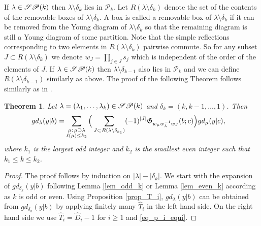 \documentclass[a4paper]{amsart}
\newtheorem{thm}{Theorem}[section]
\theoremstyle{remark}
\numberwithin{equation}{section}
\begin{document}
 If $\lambda\in \mathscr{SP}(k)$ then  $\lambda\setminus \delta_k$ lies in $\mathscr{P}_k$.
Let $R(\lambda\setminus\delta_k)$ denote the set of the contents of the removable boxes of $\lambda\setminus \delta_k$. A box is called a removable box of $\lambda\setminus \delta_k$ if it can be removed from the Young diagram of $\lambda\setminus \delta_k$ so that the remaining diagram is still a Young diagram of some partition. Note that the simple reflections corresponding  to two elements in $R(\lambda\setminus\delta_k)$ pairwise commute.
So for any subset $J\subset R(\lambda\setminus\delta_k)$ we denote $w_J=\prod_{j\in J}s_j$ which is independent of the order of the elements of $J$. %
If $\lambda\in \mathscr{SP}(k)$ then $\lambda\setminus \delta_{k-1}$ also lies in $\mathscr{P}_k$ and we can define $R(\lambda\setminus\delta_{k-1})$ similarly as above. The proof of the following Theorem follows similarly as in \cite[Theorem 4.10]{BIIY}.

% 

\begin{thm}\label{thm:gp expansion}
Let $\lambda=(\lambda_1,\dots,\lambda_k)\in \mathscr{SP}(k)$ and $\delta_k=(k,k-1,\dots,1)$.  Then
 \begin{align*}
gd_\lambda(y| b)&=\sum_{\substack{\mu:\,\mu\supset \lambda\\ \ell(\mu)\leq k_2}}\Big(\sum_{J\subset R(\lambda\setminus \delta_{k_1})}
(-1)^{|J|} \mathfrak{G}_{w_{\mu}w_\lambda^{-1}w_J}(b;c)\Big)
 gd_{\mu}(y| c),
 \end{align*}
 where $k_1$ is the largest odd integer and $k_2$ is the smallest even integer such that $k_1\leq k\le k_2$.
\end{thm}

\begin{proof}
    The proof follows by induction on $|\lambda|-|\delta_k|$. We start with the expansion of $gd_{\delta_k}(y| b)$ following Lemma \ref{lem_odd_k} or Lemma \ref{lem_even_k} according as $k$ is odd or even. Using Proposition \ref{prop_T_i}, $gd_\lambda(y| b)$ can be obtained from $gd_{\delta_k}(y| b)$ by applying finitely many $\hat{T}_i$ in the left hand side. On the right hand side we use $\hat{T}_i=\hat{D}_i-1$ for $i\geq 1$ and \eqref{eq_p_i_equi}. 
\end{proof}
\end{document}
